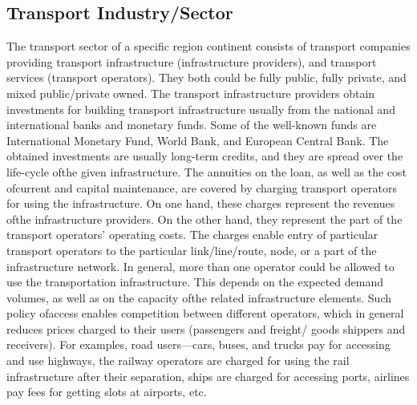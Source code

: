 \subsection{Transport Industry/Sector}
The transport sector of a specific region continent consists of transport companies providing transport infrastructure (infrastructure providers), and transport services (transport operators). They both could be fully public, fully private, and mixed public/private owned. The transport infrastructure providers obtain investments for building transport infrastructure usually from the national and international banks and monetary funds. Some of the well-known funds are International Monetary Fund, World Bank, and European Central Bank. The obtained investments are usually long-term credits, and they are spread over the life-cycle ofthe given infrastructure. The annuities on the loan, as well as the cost ofcurrent and capital maintenance, are covered by charging transport operators for using the infrastructure. On one hand, these charges represent the revenues ofthe infrastructure providers. On the other hand, they represent the part of the transport operators’ operating costs. The charges enable entry of particular transport operators to the particular link/line/route, node, or a part of the infrastructure network. In general, more than one operator could be allowed to use the transportation infrastructure. This depends on the expected demand volumes, as well as on the capacity ofthe related infrastructure elements. Such policy ofaccess enables competition between different operators, which in general reduces prices charged to their users (passengers and freight/ goods shippers and receivers). For examples, road users—cars, buses, and trucks pay for accessing and use highways, the railway operators are charged for using the rail infrastructure after their separation, ships are charged for accessing ports, airlines pay fees for getting slots at airports, etc.
%
